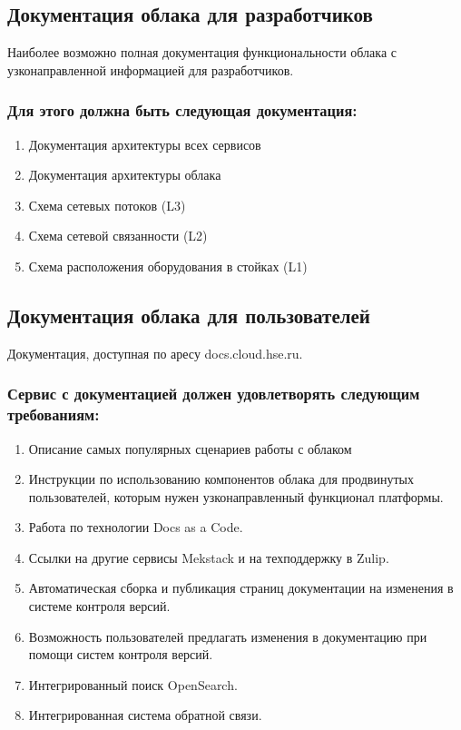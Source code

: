 \documentclass[14pt, a4paper]{extarticle}
\begin{document}
\subsection{Документация облака для разработчиков}

Наиболее возможно полная документация функциональности облака с узконаправленной информацией для разработчиков.

\subsubsection*{Для этого должна быть следующая документация:}

\begin{enumerate}
\item Документация архитектуры всех сервисов
\item Документация архитектуры облака
\item Схема сетевых потоков (L3)
\item Схема сетевой связанности (L2)
\item Схема расположения оборудования в стойках (L1)
\end{enumerate}

\subsection{Документация облака для пользователей}

Документация, доступная по аресу docs.cloud.hse.ru.

\subsubsection*{Сервис с документацией должен удовлетворять следующим требованиям:}

\begin{enumerate}
\item Описание самых популярных сценариев работы с облаком
\item Инструкции по использованию компонентов облака для продвинутых пользователей, которым нужен узконаправленный функционал платформы.
\item Работа по технологии Docs as a Code.
\item Ссылки на другие сервисы Mekstack и на техподдержку в Zulip.
\item Автоматическая сборка и публикация страниц документации на изменения в системе контроля версий.
\item Возможность пользователей предлагать изменения в документацию при помощи систем контроля версий.
\item Интегрированный поиск OpenSearch.
\item Интегрированная система обратной связи.
\end{enumerate}
\end{document}
